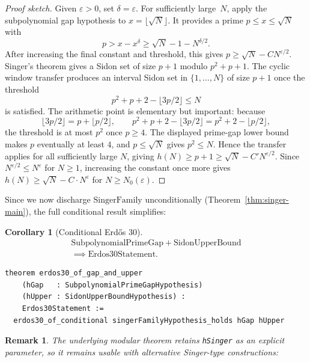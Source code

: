 \documentclass[11pt,a4paper]{article}
\newtheorem{corollary}[theorem]{Corollary}
\newtheorem{remark}[theorem]{Remark}
\begin{document}
\begin{proof}[Proof sketch]
Given $\varepsilon > 0$, set $\delta = \varepsilon$.  For sufficiently
large~$N$, apply the subpolynomial gap hypothesis to
\(x=\lfloor\sqrt N\rfloor\).  It provides a prime \(p\le x\le\sqrt N\) with
\[
  p>x-x^\delta\ge \sqrt N-1-N^{\delta/2}.
\]
After increasing the final constant and threshold, this gives
\(p\ge\sqrt N-CN^{\varepsilon/2}\).  Singer's theorem gives a Sidon set of size $p+1$
modulo $p^2+p+1$.  The cyclic window transfer produces an interval Sidon
set in $\{1,\dots,N\}$ of size $p+1$ once the threshold
\[
  p^2+p+2-\lfloor 3p/2\rfloor \le N
\]
is satisfied.  The arithmetic point is elementary but important: because
\[
  \lfloor 3p/2\rfloor = p+\lfloor p/2\rfloor,
  \qquad
  p^2+p+2-\lfloor 3p/2\rfloor
    = p^2+2-\lfloor p/2\rfloor,
\]
the threshold is at most \(p^2\) once \(p\ge4\).  The displayed prime-gap
lower bound makes \(p\) eventually at least \(4\), and \(p\le\sqrt N\) gives
\(p^2\le N\).  Hence the transfer applies for all sufficiently large \(N\),
giving \(h(N) \ge p+1 \ge \sqrt{N} - C' N^{\varepsilon/2}\).  Since
\(N^{\varepsilon/2}\le N^\varepsilon\) for \(N\ge1\), increasing the constant
once more gives \(h(N)\ge \sqrt N-C\cdot N^\varepsilon\) for
\(N\ge N_0(\varepsilon)\).
\end{proof}

Since we now discharge $\mathrm{SingerFamily}$ unconditionally
(Theorem~\ref{thm:singer-main}), the full conditional result simplifies:

\begin{corollary}[Conditional Erd\H{o}s 30]
\label{cor:cond-erdos30}
\begin{multline*}
\mathrm{SubpolynomialPrimeGap} + \mathrm{SidonUpperBound} \\
\implies \mathrm{Erdos30Statement}.
\end{multline*}
\end{corollary}

\begin{lstlisting}
theorem erdos30_of_gap_and_upper
    (hGap   : SubpolynomialPrimeGapHypothesis)
    (hUpper : SidonUpperBoundHypothesis) :
    Erdos30Statement :=
  erdos30_of_conditional singerFamilyHypothesis_holds hGap hUpper
\end{lstlisting}

\begin{remark}
The underlying modular theorem retains \texttt{hSinger} as an explicit
parameter, so it remains usable with alternative Singer-type constructions:
\end{remark}
\end{document}
